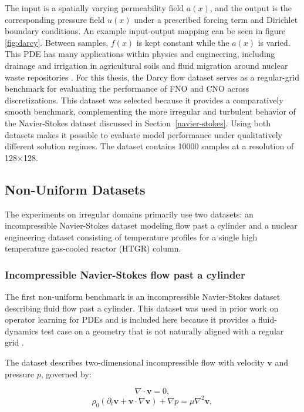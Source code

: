 The input is a spatially varying permeability field \(a(x)\), and the output is the corresponding pressure field \(u(x)\) under a prescribed forcing term and Dirichlet boundary conditions. An example
 input-output mapping can be seen in figure \ref{fig:darcy}. Between samples, $f(x)$ is kept constant while the $a(x)$ is varied. This PDE has many applications within physics and engineering, including drainage and irrigation in agricultural soils and fluid migration around nuclear waste repositories \cite{darcyapplications}. For this 
  thesis, the Darcy flow dataset serves as a regular-grid benchmark for evaluating the performance of FNO and CNO 
  across discretizations. This dataset was selected because it provides a comparatively smooth benchmark, 
  complementing the more irregular and turbulent behavior of the Navier-Stokes dataset discussed in Section~\ref{navier-stokes}. Using both datasets makes it possible to evaluate model performance under qualitatively different solution regimes. The dataset contains 10000 samples at a resolution of 128$\times$128.



\subsection{Non-Uniform Datasets}\label{non-uniform-datasets}

The experiments on irregular domains primarily use two datasets: an incompressible Navier\hyp{}Stokes
dataset modeling flow past a cylinder and a nuclear engineering
dataset consisting of temperature profiles for a single high temperature gas-cooled reactor (HTGR) column.

\subsubsection{Incompressible Navier-Stokes flow past a cylinder}\label{cylinder-flow-dataset}


The first non-uniform benchmark is an incompressible Navier-Stokes dataset
describing fluid flow past a cylinder. This dataset was used in prior
work on operator learning for PDEs and is included here because it
provides a fluid-dynamics test case on a geometry that is not naturally
aligned with a regular grid \cite{calm-pde, pfaff-datasets}.

The dataset describes two-dimensional incompressible flow with velocity
$\mathbf{v}$ and pressure $p$, governed by:

\begin{equation}
    \nabla \cdot \mathbf{v} = 0,
\end{equation}
\begin{equation}
    \rho_0 \left(\partial_t \mathbf{v} + \mathbf{v} \cdot \nabla \mathbf{v}\right) + \nabla p
    = \mu \nabla^2 \mathbf{v},
\end{equation}

